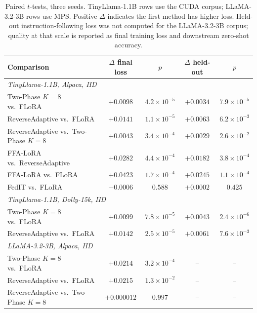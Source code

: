\documentclass{ieeetj}
\begin{document}
\begin{table}[t]
\caption{Paired $t$-tests, three seeds. TinyLlama-1.1B rows use the CUDA corpus; LLaMA-3.2-3B rows use MPS. Positive $\Delta$ indicates the first method has higher loss. Held-out instruction-following loss was not computed for the LLaMA-3.2-3B corpus; quality at that scale is reported as final training loss and downstream zero-shot accuracy.}
\label{tab:d1}
\begin{center}
\footnotesize
\setlength{\tabcolsep}{4pt}
\begin{tabular}{lcccc}
\toprule
Comparison & $\Delta$ final loss & $p$ & $\Delta$ held-out & $p$ \\
\midrule
\multicolumn{5}{l}{\emph{TinyLlama-1.1B, Alpaca, IID}} \\
Two-Phase $K{=}8$ vs.\ FLoRA & $+0.0098$ & $4.2 \times 10^{-5}$ & $+0.0034$ & $7.9 \times 10^{-5}$ \\
ReverseAdaptive vs.\ FLoRA & $+0.0141$ & $1.1 \times 10^{-5}$ & $+0.0063$ & $6.2 \times 10^{-3}$ \\
ReverseAdaptive vs.\ Two-Phase $K{=}8$ & $+0.0043$ & $3.4 \times 10^{-4}$ & $+0.0029$ & $2.6 \times 10^{-2}$ \\
FFA-LoRA vs.\ ReverseAdaptive & $+0.0282$ & $4.4 \times 10^{-4}$ & $+0.0182$ & $3.8 \times 10^{-4}$ \\
FFA-LoRA vs.\ FLoRA & $+0.0423$ & $1.7 \times 10^{-4}$ & $+0.0245$ & $1.1 \times 10^{-4}$ \\
FedIT vs.\ FLoRA & $-0.0006$ & $0.588$ & $+0.0002$ & $0.425$ \\
\midrule
\multicolumn{5}{l}{\emph{TinyLlama-1.1B, Dolly-15k, IID}} \\
Two-Phase $K{=}8$ vs.\ FLoRA & $+0.0099$ & $7.8 \times 10^{-5}$ & $+0.0043$ & $2.4 \times 10^{-6}$ \\
ReverseAdaptive vs.\ FLoRA & $+0.0142$ & $2.5 \times 10^{-5}$ & $+0.0061$ & $7.6 \times 10^{-3}$ \\
\midrule
\multicolumn{5}{l}{\emph{LLaMA-3.2-3B, Alpaca, IID}} \\
Two-Phase $K{=}8$ vs.\ FLoRA & $+0.0214$ & $3.2 \times 10^{-4}$ & -- & -- \\
ReverseAdaptive vs.\ FLoRA & $+0.0215$ & $1.3 \times 10^{-2}$ & -- & -- \\
ReverseAdaptive vs.\ Two-Phase $K{=}8$ & $+0.000012$ & $0.997$ & -- & -- \\
\bottomrule
\end{tabular}
\end{center}
\end{table}
\end{document}
